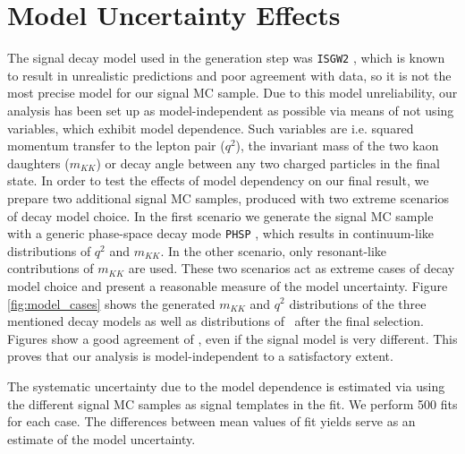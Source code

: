 \section{Model Uncertainty Effects}
The signal decay model used in the generation step was \texttt{ISGW2} \cite{Scora:1995ty}, which is known to result in unrealistic predictions and poor agreement with data, so it is not the most precise model for our signal MC sample. Due to this model unreliability, our analysis has been set up as model-independent as possible via means of not using variables, which exhibit model dependence. Such variables are i.e. squared momentum transfer to the lepton pair ($q^2$), the invariant mass of the two kaon daughters ($m_{KK}$) or decay angle between any two charged particles in the final state.
In order to test the effects of model dependency on our final result, we prepare two additional signal MC samples, produced with two extreme scenarios of decay model choice. In the first scenario we generate the signal MC sample with a generic phase-space decay mode \texttt{PHSP} \cite{lange2001dj}, which results in continuum-like distributions of $q^2$ and $m_{KK}$. In the other scenario, only resonant-like contributions of $m_{KK}$ are used. These two scenarios act as extreme cases of decay model choice and present a reasonable measure of the model uncertainty. Figure \ref{fig:model_cases} shows the generated $m_{KK}$ and $q^2$ distributions of the three mentioned decay models as well as distributions of \vars~after the final selection. Figures show a good agreement of \vars, even if the signal model is very different. This proves that our analysis is model-independent to a satisfactory extent.

The systematic uncertainty due to the model dependence is estimated via using the different signal MC samples as signal templates in the fit. We perform 500 fits for each case. The differences between mean values of fit yields serve as an estimate of the model uncertainty.


